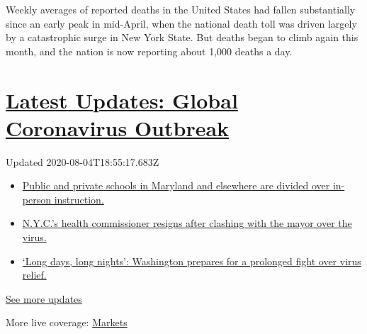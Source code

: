 Weekly averages of reported deaths in the United States had fallen
substantially since an early peak in mid-April, when the national death
toll was driven largely by a catastrophic surge in New York State. But
deaths began to climb again this month, and the nation is now reporting
about 1,000 deaths a day.

\hypertarget{latest-updates-global-coronavirus-outbreak}{%
\section{\texorpdfstring{\href{https://www.nytimes3xbfgragh.onion/2020/08/04/world/coronavirus-cases.html?action=click\&pgtype=Article\&state=default\&region=MAIN_CONTENT_1\&context=storylines_live_updates}{Latest
Updates: Global Coronavirus
Outbreak}}{Latest Updates: Global Coronavirus Outbreak}}\label{latest-updates-global-coronavirus-outbreak}}

Updated 2020-08-04T18:55:17.683Z

\begin{itemize}
\tightlist
\item
  \href{https://www.nytimes3xbfgragh.onion/2020/08/04/world/coronavirus-cases.html?action=click\&pgtype=Article\&state=default\&region=MAIN_CONTENT_1\&context=storylines_live_updates\#link-4825b93}{Public
  and private schools in Maryland and elsewhere are divided over
  in-person instruction.}
\item
  \href{https://www.nytimes3xbfgragh.onion/2020/08/04/world/coronavirus-cases.html?action=click\&pgtype=Article\&state=default\&region=MAIN_CONTENT_1\&context=storylines_live_updates\#link-4d1eafa8}{N.Y.C.'s
  health commissioner resigns after clashing with the mayor over the
  virus.}
\item
  \href{https://www.nytimes3xbfgragh.onion/2020/08/04/world/coronavirus-cases.html?action=click\&pgtype=Article\&state=default\&region=MAIN_CONTENT_1\&context=storylines_live_updates\#link-6b644638}{`Long
  days, long nights': Washington prepares for a prolonged fight over
  virus relief.}
\end{itemize}

\href{https://www.nytimes3xbfgragh.onion/2020/08/04/world/coronavirus-cases.html?action=click\&pgtype=Article\&state=default\&region=MAIN_CONTENT_1\&context=storylines_live_updates}{See
more updates}

More live coverage:
\href{https://www.nytimes3xbfgragh.onion/live/2020/08/04/business/stock-market-today-coronavirus?action=click\&pgtype=Article\&state=default\&region=MAIN_CONTENT_1\&context=storylines_live_updates}{Markets}

